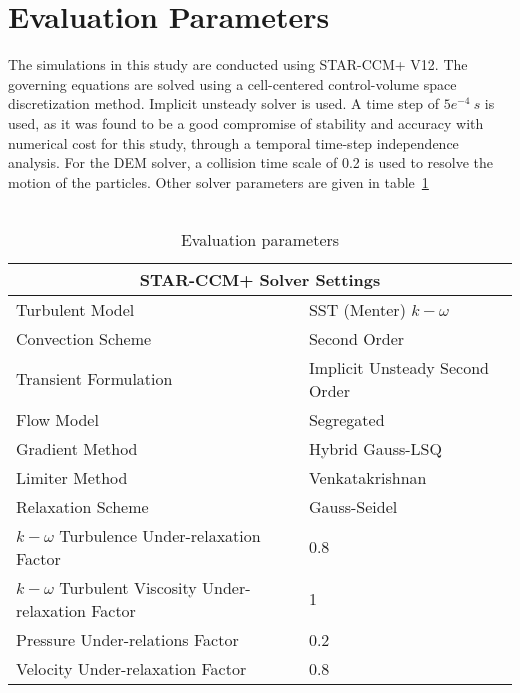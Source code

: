 \section{Evaluation Parameters}
The simulations in this study are conducted using STAR-CCM+ V12. The governing equations  are solved using a cell-centered control-volume space discretization method. Implicit unsteady solver is used. A time step of $5e^{-4}~s$ is used, as it was found to be a good compromise of stability and accuracy with numerical cost for this study, through a temporal time-step independence analysis. For the DEM solver, a collision time scale of 0.2 %
 is used to resolve the motion of the particles. Other solver parameters are given in table~\ref{SolverParameters}\\ \\ 
\begin{table}
\caption{Evaluation parameters}
\begin{tabular}{ |p{9cm}|p{7cm}|}
 \hline
 \multicolumn{2}{|c|}{STAR-CCM+ Solver Settings} \\
 \hline
 Turbulent Model& SST (Menter) $k-\omega$\\
 Convection Scheme & Second Order\\
 Transient Formulation & Implicit Unsteady Second Order\\
 Flow Model   & Segregated\\
 Gradient Method & Hybrid Gauss-LSQ\\
 Limiter Method & Venkatakrishnan \\
 Relaxation Scheme & Gauss-Seidel\\
 $k-\omega$ Turbulence Under-relaxation Factor & 0.8\\
 $k-\omega$ Turbulent Viscosity Under-relaxation Factor & 1\\
 Pressure Under-relations Factor & 0.2\\
 Velocity Under-relaxation Factor & 0.8\\
 \hline
\end{tabular}
\label{SolverParameters}
\end{table}



